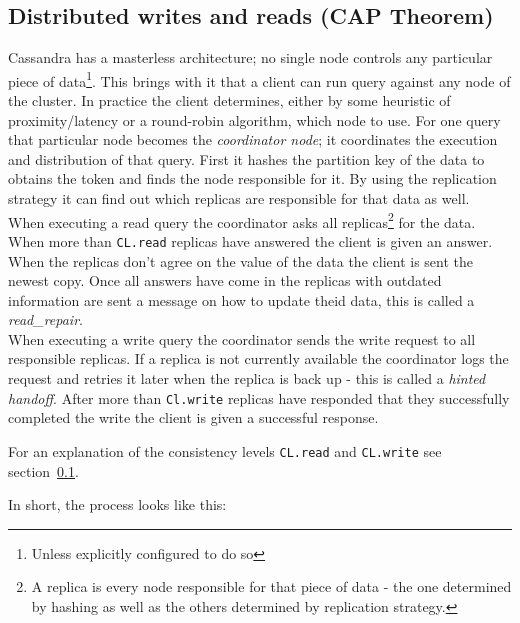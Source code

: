 \subsection{Distributed writes and reads (CAP Theorem)} \label{subsec:cassandra:cap}

Cassandra has a masterless architecture; no single node controls any particular piece of data\autocite[5]{cassandra_paper}\footnote{Unless explicitly configured to do so}. This brings with it that a client can run query against any node of the cluster. In practice the client determines, either by some heuristic of proximity/latency or a round-robin algorithm, which node to use.
For one query that particular node becomes the \textit{coordinator node}; it coordinates the execution and distribution of that query.
First it hashes the partition key of the data to obtains the token and finds the node responsible for it. By using the replication strategy it can find out which replicas are responsible for that data as well. \\
When executing a read query the coordinator asks all replicas\footnote{A replica is every node responsible for that piece of data - the one determined by hashing as well as the others determined by replication strategy.} for the data. When more than \texttt{CL.read} replicas have answered the client is given an answer. When the replicas don't agree on the value of the data the client is sent the newest copy. Once all answers have come in the replicas with outdated information are sent a message on how to update theid data, this is called a \textit{read\_repair}. \autocite{cassandra_distributed_read} \\
When executing a write query the coordinator sends the write request to all responsible replicas. If a replica is not currently available the coordinator logs the request and retries it later when the replica is back up  - this is called a \textit{hinted handoff}\autocite[6,7]{cassandraInCAPtheorem}. After more than \texttt{Cl.write} replicas have responded that they successfully completed the write the client is given a successful response. \autocite{cassandra_distributed_write}

For an explanation of the consistency levels \texttt{CL.read} and \texttt{CL.write} see section~\ref{subsec:cassandra:cap}.

In short, the process looks like this:

